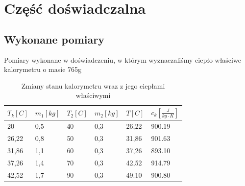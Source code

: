 \documentclass{article}
\begin{document}
\clearpage

\section{Część doświadczalna}
\subsection{Wykonane pomiary}
Pomiary wykonane w doświadczeniu, w którym wyznaczaliśmy ciepło właściwe kalorymetru o masie 765g
\begin{table}[h!]
\centering
\begin{tabular}{|l|l|l|l|l|l|}
\hline
$T_{k} [C]$ & $m_{1} [kg]$ &  $T_{2}[C]$ &  $m_{2} [kg]$ & $T [C]$      &$c_{k} [\frac{J}{kg\cdot K}]$                \\ \hline
20          & 0,5       & 40                & 0,3             &26,22        &900.19                 \\ 
26,22       & 0,8       & 50                & 0,3             &31,86        &901.63               \\ 
31,86       & 1,1       & 60                & 0,3             &37,26        &893.10                 \\ 
37,26       & 1,4       & 70                & 0,3             &42,52        &914.79              \\ 
42,52       & 1,7       & 90                & 0,3             &49.10        &900.80             \\ \hline
\end{tabular}
\caption{Zmiany stanu kalorymetru wraz z jego ciepłami właściwymi}
\end{table}
\end{document}
